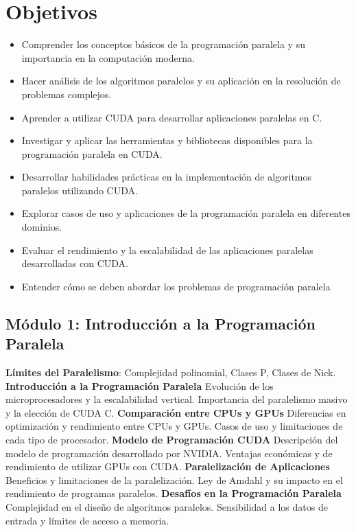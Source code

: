 \section*{Objetivos}
\begin {itemize}
  \item Comprender los conceptos básicos de la programación paralela y su importancia en la computación moderna.
  \item Hacer análisis de los algoritmos paralelos y su aplicación en la resolución de problemas complejos.
  \item Aprender a utilizar CUDA para desarrollar aplicaciones paralelas en C.
  \item Investigar y aplicar las herramientas y bibliotecas disponibles para la programación paralela en CUDA.
  \item Desarrollar habilidades prácticas en la implementación de algoritmos paralelos utilizando CUDA.
  \item Explorar casos de uso y aplicaciones de la programación paralela en diferentes dominios.
  \item Evaluar el rendimiento y la escalabilidad de las aplicaciones paralelas desarrolladas con CUDA.
  \item Entender cómo se deben abordar los problemas de programación paralela
\end {itemize}


\subsection{Módulo 1: Introducción a la Programación Paralela}

\textbf{Límites del Paralelismo}: Complejidad polinomial, Clases P, Clases de Nick. \textbf{Introducción a la
Programación Paralela} Evolución de los microprocesadores y la escalabilidad vertical. Importancia del paralelismo
masivo y la elección de CUDA C. \textbf{Comparación entre CPUs y GPUs} Diferencias en optimización y rendimiento entre
CPUs y GPUs. Casos de uso y limitaciones de cada tipo de procesador. \textbf{Modelo de Programación CUDA} Descripción
del modelo de programación desarrollado por NVIDIA. Ventajas económicas y de rendimiento de utilizar GPUs con CUDA.
\textbf{Paralelización de Aplicaciones} Beneficios y limitaciones de la paralelización. Ley de Amdahl y su impacto en el
rendimiento de programas paralelos. \textbf{Desafíos en la Programación Paralela} Complejidad en el diseño de algoritmos
paralelos. Sensibilidad a los datos de entrada y límites de acceso a memoria.



